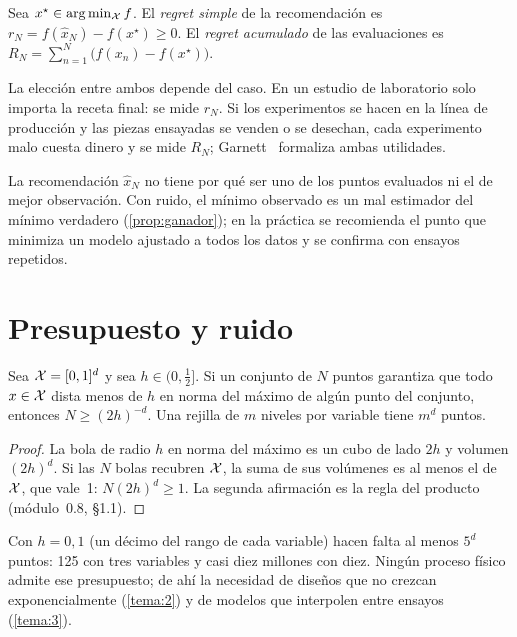 \begin{definicion}[Regret]\label{def:regret}
Sea $x^\star\in\arg\min_{\mathcal{X}}f$. El \emph{regret simple} de la recomendación es $r_N=f(\hat x_N)-f(x^\star)\ge 0$. El \emph{regret acumulado} de las evaluaciones es $R_N=\sum_{n=1}^{N}\bigl(f(x_n)-f(x^\star)\bigr)$.
\end{definicion}

La elección entre ambos depende del caso. En un estudio de laboratorio solo importa la receta final: se mide $r_N$. Si los experimentos se hacen en la línea de producción y las piezas ensayadas se venden o se desechan, cada experimento malo cuesta dinero y se mide $R_N$; Garnett~\cite[§6.1–6.2]{garnett} formaliza ambas utilidades.

\begin{observacion}
La recomendación $\hat x_N$ no tiene por qué ser uno de los puntos evaluados ni el de mejor observación. Con ruido, el mínimo observado es un mal estimador del mínimo verdadero (\cref{prop:ganador}); en la práctica se recomienda el punto que minimiza un modelo ajustado a todos los datos y se confirma con ensayos repetidos.
\end{observacion}

\section{Presupuesto y ruido}

\begin{proposicion}\label{prop:rejilla}
Sea $\mathcal{X}=[0,1]^{d}$ y sea $h\in(0,\tfrac12]$. Si un conjunto de $N$ puntos garantiza que todo $x\in\mathcal{X}$ dista menos de $h$ en norma del máximo de algún punto del conjunto, entonces $N\ge(2h)^{-d}$. Una rejilla de $m$ niveles por variable tiene $m^{d}$ puntos.
\end{proposicion}

\begin{proof}
La bola de radio $h$ en norma del máximo es un cubo de lado $2h$ y volumen $(2h)^{d}$. Si las $N$ bolas recubren $\mathcal{X}$, la suma de sus volúmenes es al menos el de $\mathcal{X}$, que vale~1: $N(2h)^{d}\ge 1$. La segunda afirmación es la regla del producto (módulo~0.8, §1.1).
\end{proof}

Con $h=0{,}1$ (un décimo del rango de cada variable) hacen falta al menos $5^{d}$ puntos: 125 con tres variables y casi diez millones con diez. Ningún proceso físico admite ese presupuesto; de ahí la necesidad de diseños que no crezcan exponencialmente (\cref{tema:2}) y de modelos que interpolen entre ensayos (\cref{tema:3}).

